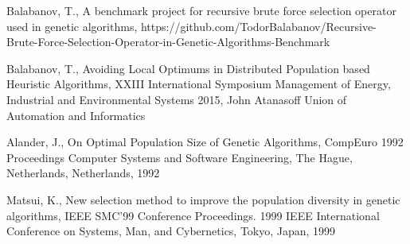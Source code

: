 \begin{thebibliography}{99.}
Balabanov, T., A benchmark project for recursive brute force selection operator used in genetic algorithms, https://github.com/TodorBalabanov/Recursive-Brute-Force-Selection-Operator-in-Genetic-Algorithms-Benchmark

Balabanov, T., Avoiding Local Optimums in Distributed Population based Heuristic Algorithms, XXIII International Symposium Management of Energy, Industrial and Environmental Systems 2015, John Atanasoff Union of Automation and Informatics

Alander, J., On Optimal Population Size of Genetic Algorithms, CompEuro 1992 Proceedings Computer Systems and Software Engineering, The Hague, Netherlands, Netherlands, 1992

Matsui, K., New selection method to improve the population diversity in genetic algorithms, IEEE SMC'99 Conference Proceedings. 1999 IEEE International Conference on Systems, Man, and Cybernetics, Tokyo, Japan, 1999
\end{thebibliography}
